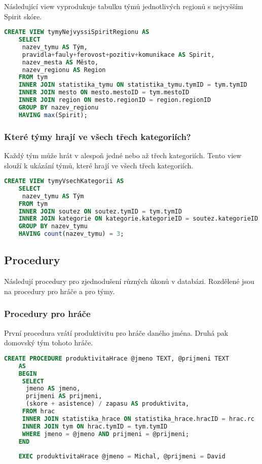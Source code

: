 \documentclass[11pt,oneside,american,czech]{book}
\begin{document}
Následující view vyprodukuje tabulku týmů jednotlivých regionů s nejvyšším Spirit skóre.

\begin{lstlisting}[language=SQL]
	CREATE VIEW tymyNejvyssiSpiritRegionu AS
	SELECT
	 nazev_tymu AS Tým,
	 pravidla+fauly+ferovost+pozitiv+komunikace AS Spirit,
	 nazev_mesta AS Město,
	 nazev_regionu AS Region
	FROM tym
	INNER JOIN statistika_tymu ON statistika_tymu.tymID = tym.tymID
	INNER JOIN mesto ON mesto.mestoID = tym.mestoID
	INNER JOIN region ON mesto.regionID = region.regionID
	GROUP BY nazev_regionu
	HAVING max(Spirit);
\end{lstlisting}

\subsubsection*{Které týmy hrají ve všech třech kategoriích?}

Každý tým může hrát v alespoň jedné nebo až třech kategoriích. Tento view slouží k ukázání týmů, které hrají ve všech třech kategoriích.

\begin{lstlisting}[language=SQL]
	CREATE VIEW tymyVsechKategorii AS
	SELECT
	 nazev_tymu AS Tým
	FROM tym
	INNER JOIN soutez ON soutez.tymID = tym.tymID
	INNER JOIN kategorie ON kategorie.kategorieID = soutez.kategorieID
	GROUP BY nazev_tymu
	HAVING count(nazev_tymu) = 3;
\end{lstlisting}

\pagebreak
\subsection*{Procedury}

Následují procedury pro zjednodušení různých úkonů v databázi. Rozdělené jsou na procedury pro hráče a pro týmy.

\subsubsection*{Procedury pro hráče}

První procedura vrátí produktivitu pro hráče daného jména. Druhá pak domovský tým tohoto hráče.

\begin{lstlisting}[language=SQL]
	CREATE PROCEDURE produktivitaHrace @jmeno TEXT, @prijmeni TEXT
	AS
	BEGIN
	 SELECT
	  jmeno AS jmeno,
	  prijmeni AS prijmeni,
	  (skore + asistence) / zapasu AS produktivita,
	 FROM hrac
	 INNER JOIN statistika_hrace ON statistika_hrace.hracID = hrac.rc
	 INNER JOIN tym ON hrac.tymID = tym.tymID
	 WHERE jmeno = @jmeno AND prijmeni = @prijmeni;
	END
	
	EXEC produktivitaHrace @jmeno = Michal, @prijmeni = David	
\end{lstlisting}
\end{document}
